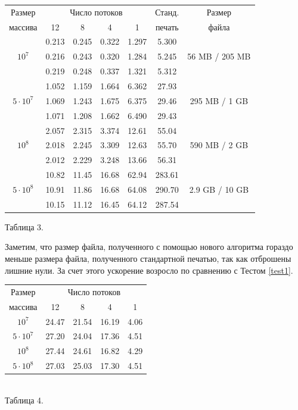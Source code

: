 \begin{center}
\begin{longtable}{||c|c|c|c|c|c|c||}
\hline
\hline
Размер & \multicolumn{4}{c|}{Число потоков} & Станд. & Размер\\
\hhline{~|-|-|-|-|~|~|}
массива & 12 & 8 & 4 & 1 & печать & файла\\
\hline
\hline
 & 0.213 & 0.245 & 0.322 & 1.297 & 5.300  &\\
\hhline{~|-|-|-|-|-|}
$10^7$ & 0.216 & 0.243 & 0.320 & 1.284 & 5.245  &56 MB / 205 MB \\
\hhline{~|-|-|-|-|-|}
 & 0.219 & 0.248 & 0.337 & 1.321 & 5.312  &\\
\hline
& 1.052 & 1.159 & 1.664 & 6.362 & 27.93  &\\
\hhline{~|-|-|-|-|-|}
$5 \cdot 10^7$& 1.069 & 1.243 & 1.675 & 6.375 & 29.46  &295 MB / 1 GB\\
\hhline{~|-|-|-|-|-|}
& 1.071  & 1.208 & 1.662 & 6.490 & 29.43  &\\
\hline
 & 2.057 & 2.315 & 3.374 & 12.61 & 55.04 & \\
\hhline{~|-|-|-|-|-|}
$10^8$ & 2.018 & 2.245 & 3.309 & 12.63 & 55.70  & 590 MB / 2 GB \\
\hhline{~|-|-|-|-|-|}
 & 2.012 & 2.229 & 3.248 & 13.66 & 56.31  &\\
\hline
 & 10.82 & 11.45 & 16.68 & 62.94 & 283.61  &\\
\hhline{~|-|-|-|-|-|}
$5 \cdot 10^8$ & 10.91 & 11.86 & 16.68 & 64.08 & 290.70  &2.9 GB / 10 GB\\
\hhline{~|-|-|-|-|-|}
 & 10.15 & 11.12 & 16.45 & 64.12 & 287.54  &\\
\hline
\hline
\end{longtable}
\small{Таблица 3.}
\end{center}

Заметим, что размер файла, полученного с помощью нового алгоритма гораздо меньше размера файла, полученного стандартной печатью, так как отброшены лишние нули.
За счет этого ускорение возросло по сравнению с Тестом \ref{test1}.

\begin{center}
\begin{tabular}{||c|c|c|c|c||}
\hline
\hline
Размер & \multicolumn{4}{c|}{Число потоков}\\
\hhline{~|-|-|-|-|}
массива & 12 & 8 & 4 & 1 \\
\hline
$10^7$  & 24.47 & 21.54 & 16.19 & 4.06 \\
\hline
$5 \cdot 10^7$ & 27.20 & 24.04 & 17.36 & 4.51 \\
\hline
$10^8$ & 27.44 & 24.61 & 16.82 & 4.29 \\
\hline
$5 \cdot 10^8$ & 27.03 & 25.03 & 17.30 & 4.51 \\
\hline
\hline
\end{tabular}
\\
\vspace{14pt}
\small{Таблица 4.}
\end{center}

